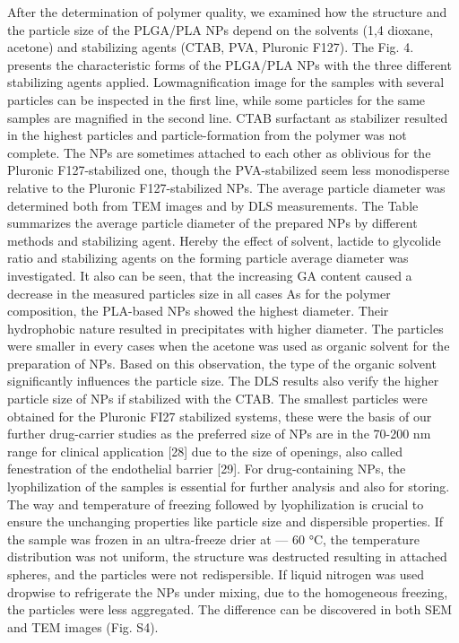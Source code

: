 \documentclass[11pt,letterpaper]{article}
\begin{document}
	After the determination of polymer quality, we examined how the
	structure and the particle size of the PLGA/PLA NPs depend on the
	solvents (1,4 dioxane, acetone) and stabilizing agents (CTAB, PVA,
	Pluronic F127). The Fig. 4. presents the characteristic forms of the
	PLGA/PLA NPs with the three different stabilizing agents applied. Lowmagnification image for the samples with several particles can be inspected in the first line, while some particles for the same samples are
	magnified in the second line. CTAB surfactant as stabilizer resulted in
	the highest particles and particle-formation from the polymer was not
	complete. The NPs are sometimes attached to each other as oblivious
	for the Pluronic F127-stabilized one, though the PVA-stabilized seem
	less monodisperse relative to the Pluronic F127-stabilized NPs.
	The average particle diameter was determined both from TEM
	images and by DLS measurements. The Table summarizes the average
	particle diameter of the prepared NPs by different methods and stabilizing agent. Hereby the effect of solvent, lactide to glycolide ratio and
	stabilizing agents on the forming particle average diameter was investigated. It also can be seen, that the increasing GA content caused a
	decrease in the measured particles size in all cases
	As for the polymer composition, the PLA-based NPs showed the
	highest diameter. Their hydrophobic nature resulted in precipitates
	with higher diameter. The particles were smaller in every cases when
	the acetone was used as organic solvent for the preparation of NPs.
	Based on this observation, the type of the organic solvent significantly
	influences the particle size. The DLS results also verify the higher particle size of NPs if stabilized with the CTAB. The smallest particles were
	obtained for the Pluronic FI27 stabilized systems, these were the basis
	of our further drug-carrier studies as the preferred size of NPs are in the
	70-200 nm range for clinical application [28] due to the size of openings, also called fenestration of the endothelial barrier [29].
	For drug-containing NPs, the lyophilization of the samples is essential for further analysis and also for storing. The way and temperature of freezing followed by lyophilization is crucial to ensure the
	unchanging properties like particle size and dispersible properties. If
	the sample was frozen in an ultra-freeze drier at — 60 °C, the temperature distribution was not uniform, the structure was destructed
	resulting in attached spheres, and the particles were not redispersible. If
	liquid nitrogen was used dropwise to refrigerate the NPs under mixing,
	due to the homogeneous freezing, the particles were less aggregated.
	The difference can be discovered in both SEM and TEM images (Fig.
	S4).
	
\end{document}
